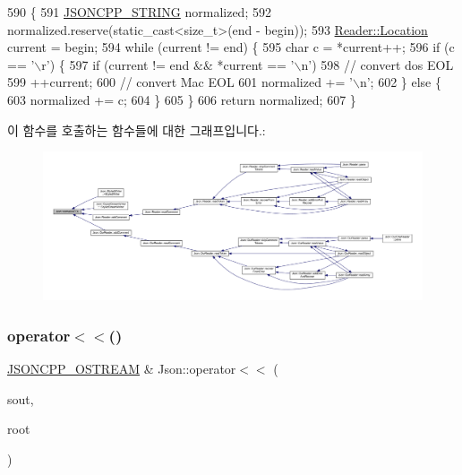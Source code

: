 \begin{DoxyCode}
590                                                                              \{
591   \hyperlink{json-forwards_8h_a1e723f95759de062585bc4a8fd3fa4be}{JSONCPP\_STRING} normalized;
592   normalized.reserve(static\_cast<size\_t>(end - begin));
593   \hyperlink{class_json_1_1_reader_a46795b5b272bf79a7730e406cb96375a}{Reader::Location} current = begin;
594   \textcolor{keywordflow}{while} (current != end) \{
595     \textcolor{keywordtype}{char} c = *current++;
596     \textcolor{keywordflow}{if} (c == \textcolor{charliteral}{'\(\backslash\)r'}) \{
597       \textcolor{keywordflow}{if} (current != end && *current == \textcolor{charliteral}{'\(\backslash\)n'})
598          \textcolor{comment}{// convert dos EOL}
599          ++current;
600       \textcolor{comment}{// convert Mac EOL}
601       normalized += \textcolor{charliteral}{'\(\backslash\)n'};
602     \} \textcolor{keywordflow}{else} \{
603       normalized += c;
604     \}
605   \}
606   \textcolor{keywordflow}{return} normalized;
607 \}
\end{DoxyCode}
이 함수를 호출하는 함수들에 대한 그래프입니다.\+:\nopagebreak
\begin{figure}[H]
\begin{center}
\leavevmode
\includegraphics[width=350pt]{namespace_json_a63123f3dd63f340ac517a59f44ea7aa4_icgraph}
\end{center}
\end{figure}
\mbox{\label{namespace_json_a975d1dbca8aa7a06f38d373edcb9081c}} 
\subsubsection{\texorpdfstring{operator$<$$<$()}{operator<<()}}
{\footnotesize\ttfamily \hyperlink{json_8h_a37a25be5fca174927780caeb280094ce}{J\+S\+O\+N\+C\+P\+P\+\_\+\+O\+S\+T\+R\+E\+AM} \& Json\+::operator$<$$<$ (\begin{DoxyParamCaption}\item[{\hyperlink{json_8h_a37a25be5fca174927780caeb280094ce}{J\+S\+O\+N\+C\+P\+P\+\_\+\+O\+S\+T\+R\+E\+AM} \&}]{sout,  }\item[{const \hyperlink{class_json_1_1_value}{Value} \&}]{root }\end{DoxyParamCaption})}



